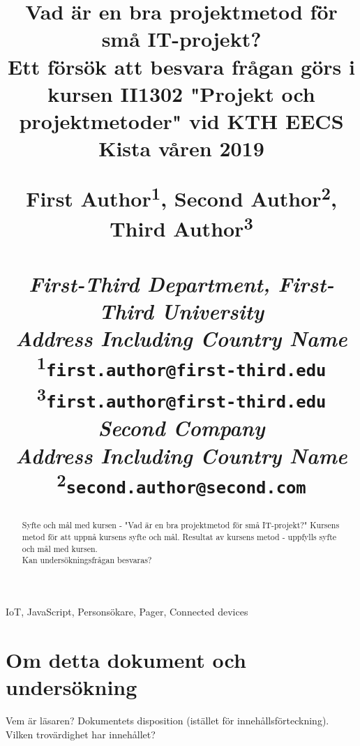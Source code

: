\documentclass[conference]{IEEEtran}
\begin{document}
\title{
    Vad är en bra projektmetod för små IT-projekt?\\
{\normalsize Ett försök att besvara frågan görs i kursen II1302 "Projekt och projektmetoder"
vid KTH EECS Kista våren 2019}

\begin{center}
    \large{ 
        First Author\textsuperscript{1}, Second Author\textsuperscript{2}, 
        Third Author\textsuperscript{3}\\
        \textit{\\First-Third Department, First-Third University\\
                Address Including Country Name\\}
        \textsuperscript{1}\texttt{first.author@first-third.edu}\\
        \textsuperscript{3}\texttt{first.author@first-third.edu}\\
        \textit{Second Company\\
        Address Including Country Name\\}
        \textsuperscript{2}\texttt{second.author@second.com}
    }
\end{center}
}

\author{}

\maketitle

\begin{abstract}
Syfte och mål med kursen - "Vad är en bra projektmetod för små IT-projekt?" Kursens metod för att uppnå
kursens syfte och mål. Resultat av kursens metod - uppfylls syfte och mål med kursen.\\
Kan undersökningsfrågan besvaras?
\end{abstract}

\begin{IEEEkeywords}
IoT, JavaScript, Personsökare, Pager, Connected devices
\end{IEEEkeywords}

\section{Om detta dokument och undersökning}
Vem är läsaren? Dokumentets disposition (istället för innehållsförteckning). Vilken trovärdighet har innehållet?
\end{document}
